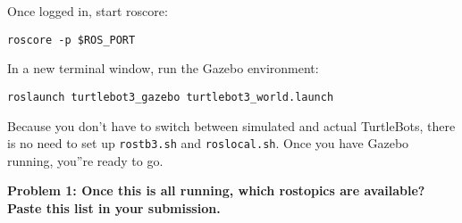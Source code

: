 Once logged in, start roscore:

\begin{lstlisting}
roscore -p $ROS_PORT
\end{lstlisting}

In a new terminal window, run the Gazebo environment:

\begin{lstlisting}
roslaunch turtlebot3_gazebo turtlebot3_world.launch
\end{lstlisting}

Because you don't have to switch between simulated and actual TurtleBots, there is no need to set up \texttt{rostb3.sh} and \texttt{roslocal.sh}. Once you have Gazebo running, you''re ready to go.

{\bf Problem 1: Once this is all running, which rostopics are available? Paste this list in your submission.}